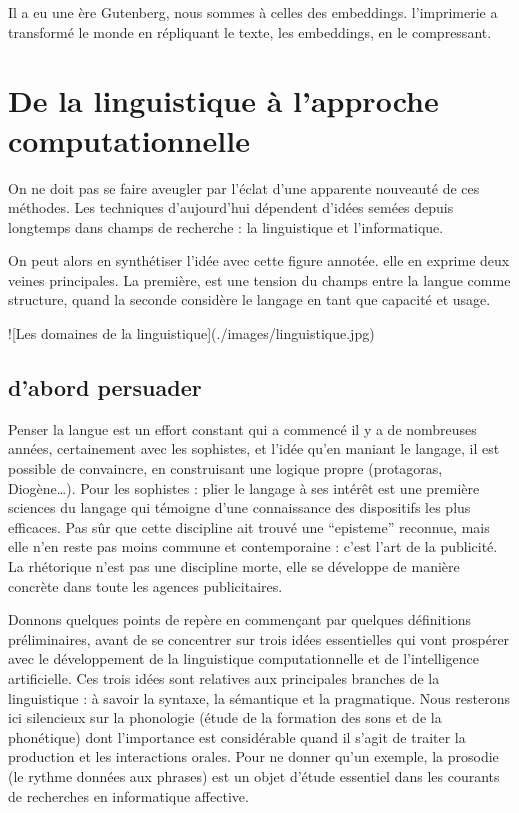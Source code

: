 \documentclass[
  letterpaper,
  DIV=11,
  numbers=noendperiod]{scrreprt}
\begin{document}
Il a eu une ère Gutenberg, nous sommes à celles des embeddings.
l'imprimerie a transformé le monde en répliquant le texte, les
embeddings, en le compressant.

\section{De la linguistique à l'approche
computationnelle}\label{de-la-linguistique-uxe0-lapproche-computationnelle}

On ne doit pas se faire aveugler par l'éclat d'une apparente nouveauté
de ces méthodes. Les techniques d'aujourd'hui dépendent d'idées semées
depuis longtemps dans champs de recherche : la linguistique et
l'informatique.

On peut alors en synthétiser l'idée avec cette figure annotée. elle en
exprime deux veines principales. La première, est une tension du champs
entre la langue comme structure, quand la seconde considère le langage
en tant que capacité et usage.

!{[}Les domaines de la linguistique{]}(./images/linguistique.jpg)

\subsection{d'abord persuader}\label{dabord-persuader}

Penser la langue est un effort constant qui a commencé il y a de
nombreuses années, certainement avec les sophistes, et l'idée qu'en
maniant le langage, il est possible de convaincre, en construisant une
logique propre (protagoras, Diogène\ldots). Pour les sophistes : plier
le langage à ses intérêt est une première sciences du langage qui
témoigne d'une connaissance des dispositifs les plus efficaces. Pas sûr
que cette discipline ait trouvé une ``episteme'' reconnue, mais elle
n'en reste pas moins commune et contemporaine : c'est l'art de la
publicité. La rhétorique n'est pas une discipline morte, elle se
développe de manière concrète dans toute les agences publicitaires.

Donnons quelques points de repère en commençant par quelques définitions
préliminaires, avant de se concentrer sur trois idées essentielles qui
vont prospérer avec le développement de la linguistique computationnelle
et de l'intelligence artificielle. Ces trois idées sont relatives aux
principales branches de la linguistique : à savoir la syntaxe, la
sémantique et la pragmatique. Nous resterons ici silencieux sur la
phonologie (étude de la formation des sons et de la phonétique) dont
l'importance est considérable quand il s'agit de traiter la production
et les interactions orales. Pour ne donner qu'un exemple, la prosodie
(le rythme données aux phrases) est un objet d'étude essentiel dans les
courants de recherches en informatique affective.
\end{document}
